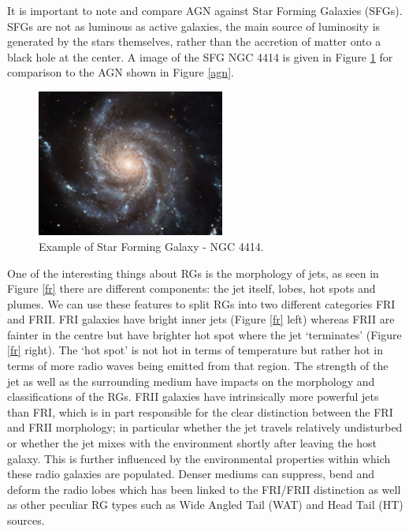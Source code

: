 \documentclass[10pt,a4paper]{article}
\begin{document}
It is important to note and compare AGN against Star Forming Galaxies (SFGs). SFGs are not as luminous as active galaxies, the main source of luminosity is generated by the stars themselves, rather than the accretion of matter onto a black hole at the center. A image of the SFG NGC 4414 is given in Figure \ref{sfg} for comparison to the AGN shown in Figure \ref{agn}.
\begin{figure}[H]
\begin{center}
	\includegraphics[width=0.55\textwidth]{M101}
	\caption{Example of Star Forming Galaxy - NGC 4414\footnotemark.}
	\label{sfg}
\end{center}
\end{figure}
One of the interesting things about RGs is the morphology of jets, as seen in Figure \ref{fr} there are different components: the jet itself, lobes, hot spots and plumes. We can use these features to split RGs into two different categories FRI and FRII. FRI galaxies have bright inner jets (Figure \ref{fr} left) whereas FRII are fainter in the centre but have brighter hot spot where the jet `terminates' (Figure \ref{fr} right). The `hot spot' is not hot in terms of temperature but rather hot in terms of more radio waves being emitted from that region. The strength of the jet as well as the surrounding medium have impacts on the morphology and classifications of the RGs. FRII galaxies have intrinsically more powerful jets than FRI, which is in part responsible for the clear distinction between the FRI and FRII morphology; in particular whether the jet travels relatively undisturbed or whether the jet mixes with the environment shortly after leaving the host galaxy. This is further influenced by the environmental properties within which these radio galaxies are populated. Denser mediums can suppress, bend and deform the radio lobes which has been linked to the FRI/FRII distinction as well as other peculiar RG types such as Wide Angled Tail (WAT) and Head Tail (HT) sources.
\end{document}
